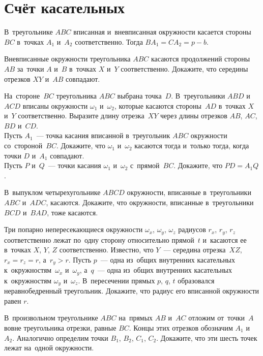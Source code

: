 
\section*{Счёт касательных}


В~треугольнике $ABC$ вписанная и~вневписанная окружности касается стороны~$BC$
в~точках $A_1$ и~$A_2$ соответственно.
Тогда $B A_1 = C A_2 = p - b$.

\begin{problems}

\item
Вневписанные окружности треугольника $ABC$ касаются продолжений стороны~$AB$
за~точки $A$ и~$B$ в~точках $X$ и~$Y$ соответственно.
Докажите, что середины отрезков $XY$ и~$AB$ совпадают.

\item
\subproblem
На~стороне~$BC$ треугольника $ABC$ выбрана точка~$D$.
В~треугольники $ABD$ и~$ACD$ вписаны окружности $\omega_1$ и~$\omega_2$,
которые касаются стороны~$AD$ в~точках $X$ и~$Y$ соответственно.
Выразите длину отрезка~$XY$ через длины отрезков $AB$, $AC$, $BD$ и~$CD$.
\\
\subproblem
{}%
Пусть $A_1$~--- точка касания вписанной в~треугольник $ABC$ окружности
со~стороной~$BC$.
Докажите, что $\omega_1$ и~$\omega_2$ касаются тогда и~только тогда, когда
точки $D$ и~$A_1$ совпадают.
\\
\subproblem
Пусть $P$ и~$Q$~--- точки касания $\omega_1$ и~$\omega_2$ с~прямой~$BC$.
Докажите, что $PD = A_1 Q$.

\item
В~выпуклом четырехугольнике $ABCD$ окружности, вписанные в~треугольники $ABC$
и~$ADC$, касаются.
Докажите, что окружности, вписанные в~треугольники $BCD$ и~$BAD$, тоже
касаются.

\item
Три попарно непересекающиеся окружности
$\omega_{x}$, $\omega_{y}$, $\omega_{z}$ радиусов $r_{x}$, $r_{y}$, $r_{z}$
соответственно лежат по~одну сторону относительно прямой~$t$ и~касаются ее
в~точках $X$, $Y$, $Z$ соответственно.
Известно, что $Y$~--- середина отрезка~$XZ$, $r_{x} = r_{z} = r$,
а~$r_{y} > r$.
Пусть $p$~--- одна из~общих внутренних касательных
к~окружностям~$\omega_x$ и~$\omega_y$, а~$q$~--- одна из~общих внутренних
касательных к~окружностям $\omega_y$ и~$\omega_z$.
В~пересечении прямых $p$, $q$, $t$ образовался неравнобедренный треугольник.
Докажите, что радиус его вписанной окружности равен $r$.

\item
В~произвольном треугольнике $ABC$ на~прямых $AB$ и~$AC$ отложим от~точки~$A$
вовне треугольника отрезки, равные $BC$.
Концы этих отрезков обозначим $A_1$ и~$A_2$.
Аналогично определим точки $B_1$, $B_2$, $C_1$, $C_2$.
Докажите, что эти шесть точек лежат на~одной окружности.

\end{problems}

